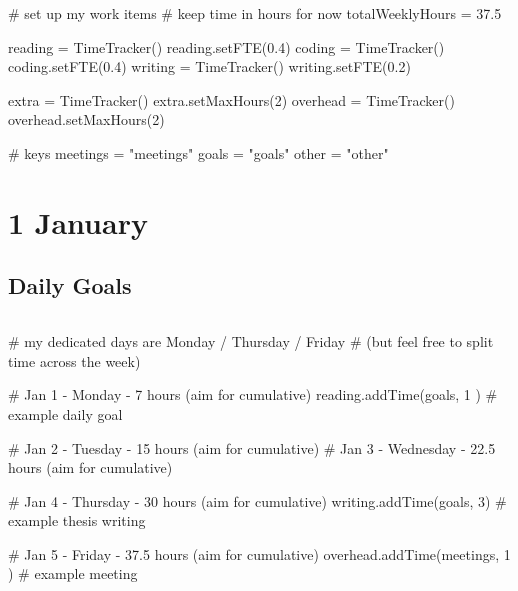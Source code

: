 \begin{sagesilent}
    # set up my work items 
    # keep time in hours for now
    totalWeeklyHours = 37.5

    reading  = TimeTracker()
    reading.setFTE(0.4)
    coding   = TimeTracker()
    coding.setFTE(0.4)
    writing  = TimeTracker()
    writing.setFTE(0.2)

    extra    = TimeTracker()
    extra.setMaxHours(2)
    overhead = TimeTracker()
    overhead.setMaxHours(2)

    # keys
    meetings = "meetings"
    goals  = "goals"
    other = "other"
\end{sagesilent}




\section{1 January}

\subsection{Daily Goals}
\begin{todolist}
    \item
\end{todolist}


\begin{verbatim}
\end{verbatim}


\begin{sagesilent}
    # my dedicated days are Monday / Thursday / Friday
    # (but feel free to split time across the week)

    # Jan 1  - Monday    - 7   hours  (aim for cumulative)
    reading.addTime(goals, 1 )      # example daily goal

    # Jan 2  - Tuesday   - 15 hours   (aim for cumulative)
    # Jan 3  - Wednesday - 22.5 hours (aim for cumulative)

    # Jan 4  - Thursday  - 30 hours   (aim for cumulative)
    writing.addTime(goals, 3)       # example thesis writing

    # Jan 5  - Friday    - 37.5 hours (aim for cumulative)
    overhead.addTime(meetings, 1 )  # example meeting

\end{sagesilent}



